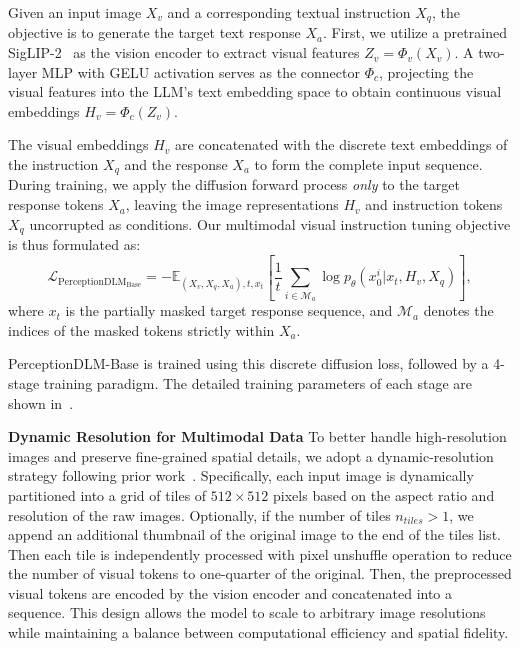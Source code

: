 Given an input image $X_v$ and a corresponding textual instruction $X_q$, the objective is to generate the target text response $X_a$. First, we utilize a pretrained SigLIP-2~\citep{tschannen2025siglip} as the vision encoder to extract visual features $Z_v = \Phi_v(X_v)$. A two-layer MLP with GELU activation serves as the connector $\Phi_{c}$, projecting the visual features into the LLM's text embedding space to obtain continuous visual embeddings $H_v = \Phi_c(Z_v)$.

The visual embeddings $H_v$ are concatenated with the discrete text embeddings of the instruction $X_q$ and the response $X_a$ to form the complete input sequence. During training, we apply the diffusion forward process \emph{only} to the target response tokens $X_a$, leaving the image representations $H_v$ and instruction tokens $X_q$ uncorrupted as conditions. Our multimodal visual instruction tuning objective is thus formulated as:
\begin{equation}
    \label{eq2}
    \mathcal{L}_{\mathrm{PerceptionDLM_{Base}}} = - \mathbb{E}_{(X_v, X_q, X_a), t, x_t} \left[ \frac{1}{t} \sum_{i \in \mathcal{M}_a} \log p_\theta(x_0^i | x_t, H_v, X_q) \right],
\end{equation}
where $x_t$ is the partially masked target response sequence, and $\mathcal{M}_a$ denotes the indices of the masked tokens strictly within $X_a$. 

PerceptionDLM-Base is trained using this discrete diffusion loss, followed by a 4-stage training paradigm. The detailed training parameters of each stage are shown in~.

\noindent
\textbf{Dynamic Resolution for Multimodal Data}
To better handle high-resolution images and preserve fine-grained spatial details, we adopt a dynamic-resolution strategy following prior work~\citep{chen2024expanding}. Specifically, each input image is dynamically partitioned into a grid of tiles of $512\times512$ pixels based on the aspect ratio and resolution of the raw images. Optionally, if the number of tiles $n_{tiles} > 1$, we append an additional thumbnail of the original image to the end of the tiles list.  Then each tile is independently processed with pixel unshuffle operation to reduce the number of visual tokens to one-quarter of the original. 
%
Then, the preprocessed visual tokens are encoded by the vision encoder and concatenated into a sequence. 
%
This design allows the model to scale to arbitrary image resolutions while maintaining a balance between computational efficiency and spatial fidelity. 

